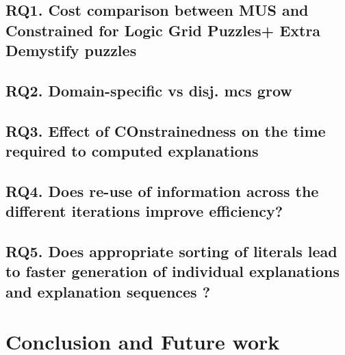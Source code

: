 \documentclass[twoside,11pt]{article}
\begin{document}
\subsection{RQ1. Cost comparison between MUS and Constrained for Logic Grid Puzzles+ Extra Demystify puzzles}



\subsection{RQ2. Domain-specific vs disj. mcs grow}

\subsection{RQ3. Effect of COnstrainedness on the time required to computed explanations}

\subsection{RQ4. Does re-use of information across the different iterations improve efficiency?}

\subsection{RQ5. Does appropriate sorting of literals lead to faster generation of individual explanations and explanation sequences ?}




% 


\section{Conclusion and Future work}

\vskip 0.2in


\end{document}
